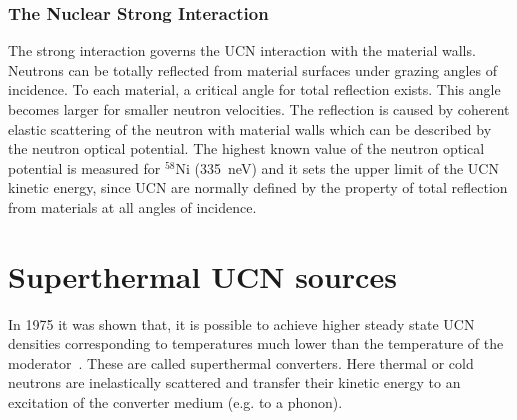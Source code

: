 \subsubsection{The Nuclear Strong Interaction}
The strong interaction governs the UCN interaction with the material
walls.  Neutrons can be totally reflected from material surfaces under
grazing angles of incidence. To each material, a critical angle for
total reflection exists. This angle becomes larger for smaller neutron
velocities.  The reflection is caused by coherent elastic scattering
of the neutron with material walls which can be described by the
neutron optical potential.  The highest known value of the neutron
optical potential is measured for $^{58}$Ni (335~neV) and it sets the
upper limit of the UCN kinetic energy, since UCN are normally defined
by the property of total reflection from materials at all angles of
incidence.



\section{Superthermal UCN sources}
In 1975 it was shown that, it is possible to achieve higher steady
state UCN densities corresponding to temperatures much lower than the
temperature of the moderator~\cite{Golub75}. These are called
superthermal converters. Here thermal or cold neutrons are
inelastically scattered and transfer their kinetic energy to an
excitation of the converter medium (e.g. to a phonon).

